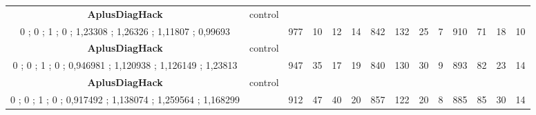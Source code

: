 \begin{table}[]
{\begin{tabular}{|c|c|c|c|c|c|c|c|c|c|c|c|c|c|}
\cellcolor{blue!15}\textbf{AplusDiagHack} & control& {\color[HTML]{00009B} } & {\color[HTML]{9A0000} } & {\color[HTML]{009901} } &  & {\color[HTML]{00009B} } & {\color[HTML]{9A0000} } & {\color[HTML]{009901} } &  & {\color[HTML]{00009B} } & {\color[HTML]{9A0000} } & {\color[HTML]{009901} } &  \\ 
\cellcolor{ blue!15}0 ; 0 ; 1 ; 0 ; 1,23308 ; 1,26326 ; 1,11807 ; 0,99693 &  & \multirow{-2}{*}{{\color[HTML]{00009B} 977}} & \multirow{-2}{*}{{\color[HTML]{9A0000} 10}} & \multirow{-2}{*}{{\color[HTML]{009901} 12}} & \multirow{-2}{*}{14} & \multirow{-2}{*}{{\color[HTML]{00009B} 842}} & \multirow{-2}{*}{{\color[HTML]{9A0000} 132}} & \multirow{-2}{*}{{\color[HTML]{009901} 25}} & \multirow{-2}{*}{7} & \multirow{-2}{*}{{\color[HTML]{00009B} 910}} & \multirow{-2}{*}{{\color[HTML]{9A0000} 71}} & \multirow{-2}{*}{{\color[HTML]{009901} 18}} & \multirow{-2}{*}{10} \\ \hline

\cellcolor{blue!15}\textbf{AplusDiagHack} & control& {\color[HTML]{00009B} } & {\color[HTML]{9A0000} } & {\color[HTML]{009901} } &  & {\color[HTML]{00009B} } & {\color[HTML]{9A0000} } & {\color[HTML]{009901} } &  & {\color[HTML]{00009B} } & {\color[HTML]{9A0000} } & {\color[HTML]{009901} } &  \\ 
\cellcolor{ blue!15}0 ; 0 ; 1 ; 0 ; 0,946981 ; 1,120938 ; 1,126149 ; 1,23813 &  & \multirow{-2}{*}{{\color[HTML]{00009B} 947}} & \multirow{-2}{*}{{\color[HTML]{9A0000} 35}} & \multirow{-2}{*}{{\color[HTML]{009901} 17}} & \multirow{-2}{*}{19} & \multirow{-2}{*}{{\color[HTML]{00009B} 840}} & \multirow{-2}{*}{{\color[HTML]{9A0000} 130}} & \multirow{-2}{*}{{\color[HTML]{009901} 30}} & \multirow{-2}{*}{9} & \multirow{-2}{*}{{\color[HTML]{00009B} 893}} & \multirow{-2}{*}{{\color[HTML]{9A0000} 82}} & \multirow{-2}{*}{{\color[HTML]{009901} 23}} & \multirow{-2}{*}{14} \\ \hline

\cellcolor{blue!15}\textbf{AplusDiagHack} & control& {\color[HTML]{00009B} } & {\color[HTML]{9A0000} } & {\color[HTML]{009901} } &  & {\color[HTML]{00009B} } & {\color[HTML]{9A0000} } & {\color[HTML]{009901} } &  & {\color[HTML]{00009B} } & {\color[HTML]{9A0000} } & {\color[HTML]{009901} } &  \\ 
\cellcolor{ blue!15}0 ; 0 ; 1 ; 0 ; 0,917492 ; 1,138074 ; 1,259564 ; 1,168299 &  & \multirow{-2}{*}{{\color[HTML]{00009B} 912}} & \multirow{-2}{*}{{\color[HTML]{9A0000} 47}} & \multirow{-2}{*}{{\color[HTML]{009901} 40}} & \multirow{-2}{*}{20} & \multirow{-2}{*}{{\color[HTML]{00009B} 857}} & \multirow{-2}{*}{{\color[HTML]{9A0000} 122}} & \multirow{-2}{*}{{\color[HTML]{009901} 20}} & \multirow{-2}{*}{8} & \multirow{-2}{*}{{\color[HTML]{00009B} 885}} & \multirow{-2}{*}{{\color[HTML]{9A0000} 85}} & \multirow{-2}{*}{{\color[HTML]{009901} 30}} & \multirow{-2}{*}{14} \\ \hline


\end{tabular}}
\end{table}
